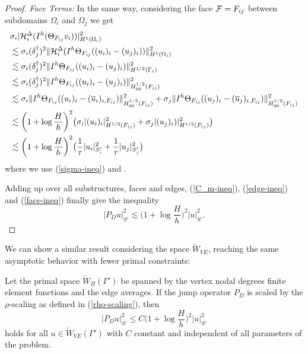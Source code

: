 \begin{proof}
    \textit{Face Terms:} In the same way, considering the face $\mathcal{F} = F_{ij}$ between subdomains $\Omega_i$ and $\Omega_j$ we get
    \begin{equation}
    \label{face-ineq}
        \begin{split}
            & \sigma_i |\mathcal{H}_i^{\Delta}(I^h(\Theta_{F_{ij}} v_i))|_{H^1(\Omega_i)}^2 \\
            & \lesssim \sigma_i (\delta_j^{\dag})^2 \|\mathcal{H}_i^{\Delta}(I^h \Theta_{F_{ij}}((u_i)_i - (u_j)_i))\|_{H^1(\Omega_i)}^2 \\
            & \lesssim \sigma_i (\delta_j^{\dag})^2 \|I^h \Theta_{F_{ij}}((u_i)_i - (u_j)_i)\|_{H^{1 / 2}(\Gamma_i)}^2 \\
            & \lesssim \sigma_i (\delta_j^{\dag})^2 \|I^h\Theta_{F_{ij}}((u_i)_i - (u_j)_i)\|_{H_{00}^{1 / 2}(F_{ij})}^2 \\
            & \lesssim \sigma_i \|I^h\Theta_{F_{ij}}((u_i)_i - (\overline u_i)_{i, F_{ij}})\|_{H_{00}^{1 / 2}(F_{ij})}^2 + \sigma_j \|I^h\Theta_{F_{ij}}((u_j)_i - (\overline u_j)_{i, F_{ij}})\|_{H_{00}^{1 / 2}(F_{ij})}^2 \\
            & \lesssim \bigg( 1 + \log \frac{H}{h} \bigg)^2 \big(\sigma_i |(u_i)_i|_{H^{1 / 2}(F_{ij})}^2 + \sigma_j |(u_j)_i)|_{H^{1 / 2}(F_{ij})}^2 \big) \\
            & \lesssim \bigg( 1 + \log \frac{H}{h}\bigg)^2 \big(\frac{1}{\tau}|u_i|_{S_i'}^2 + \frac{1}{\tau}|u_j|_{S_j'}^2 \big)
        \end{split}
    \end{equation}
    where we use (\ref{sigma-ineq}) and .

    Adding up over all substructures, faces and edges, (\ref{C_m-ineq}), (\ref{edge-ineq}) and (\ref{face-ineq}) finally give the inequality
    \[
    |P_Du|_{S'}^2 \lesssim \bigg( 1 + \log \frac{H}{h} \bigg)^2 |u|_{S'}^2.
    \]
\end{proof}

We can show a similar result considering the space $\widetilde{W}_{VE}$, reaching the same asymptotic behavior with fewer primal constraints:

\begin{lemma}
\label{lem:VE}
    Let the primal space $\widetilde W_{\Pi}(\Gamma')$ be spanned by the vertex nodal degrees finite element functions and the edge averages. If the jump operator $P_D$ is scaled by the $\rho$-scaling as defined in (\ref{rho-scaling}), then
    \begin{equation}
        |P_Du|_{S'}^2 \leq C \bigg(1 + \log \frac{H}{h} \bigg)^2 |u|_{S'}^2
    \end{equation}
    holds for all $u \in \widetilde W_{VE}(\Gamma')$ with $C$ constant and independent of all parameters of the problem.
\end{lemma}

